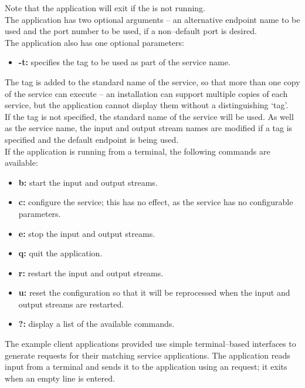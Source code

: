 Note that the application will exit if the
 is not running.\\

The application has two optional arguments -- an alternative endpoint name to be used and
the port number to be used, if a non--default port is desired.\\

The application also has one optional parameters:
\begin{itemize}
\item \textbf{-t:} specifies the tag to be used as part of the service name.
\end{itemize}
The tag is added to the standard name of the service, so that more than one copy of the
service can execute -- an \mplusm{} installation can support multiple copies of each
 service, but the 
application cannot display them without a distinguishing `tag'.\\
If the tag is not specified, the standard name of the service will be used.
As well as the service name, the input and output stream names are modified if a tag is
specified and the default endpoint is being used.\\

If the application is running from a terminal, the following commands are available:
\begin{itemize}
\item \textbf{b:} start the input and output streams. 
\item \textbf{c:} configure the service; this has no effect, as the service has no
configurable parameters. 
\item \textbf{e:} stop the input and output streams. 
\item \textbf{q:} quit the application. 
\item \textbf{r:} restart the input and output streams.
\item \textbf{u:} reset the configuration so that it will be reprocessed when the input
and output streams are restarted. 
\item \textbf{?:} display a list of the available commands.
\end{itemize}
\secondaryEnd{}
The example client applications provided use simple terminal--based interfaces to
generate requests for their matching service applications.
The  application reads input from a terminal and
sends it to the  application using an
 request; it exits when an empty line is
entered.\\

